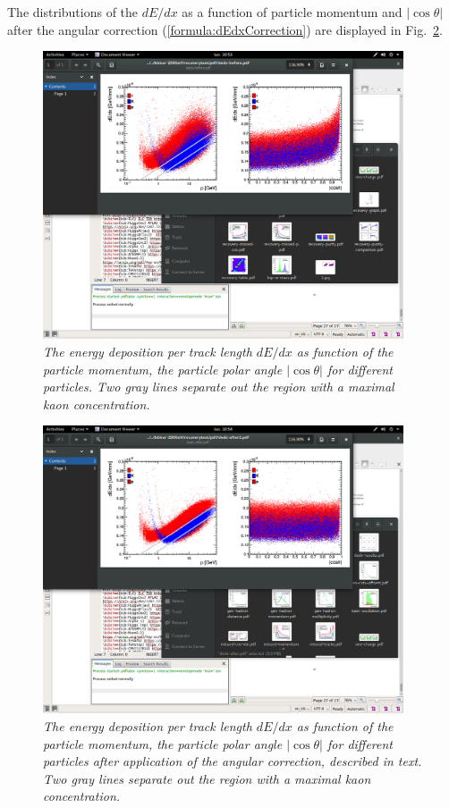 The distributions of the $dE/dx$ as a function of particle momentum and $|\cos\theta|$ after the angular correction (\ref{formula:dEdxCorrection}) are displayed in Fig.~\ref{fig:dEdxAfter_3}.
\begin{figure}[h]
{\centering
    \includegraphics[clip, trim=8cm 18.5cm 7cm 4cm,width=0.95\textwidth]{ILD/plots/dedx-before.png}
    \caption{\sl The energy deposition per track length $dE/dx$ as function of the particle momentum, the particle polar angle $|\cos\theta|$ for different particles. Two gray lines separate out the region with a maximal kaon concentration. 
    }
    \label{fig:dEdxBefore_3}
  }
\end{figure}

\begin{figure}[h]
{\centering
    \includegraphics[clip, trim=8cm 18.5cm 7cm 4cm, width=0.95\textwidth]{ILD/plots/dedx-after.png}
    \caption{\sl The energy deposition per track length $dE/dx$ as function of the particle momentum, the particle polar angle $|\cos\theta|$ for different particles after application of the angular correction, described in text. Two gray lines separate out the region with a maximal kaon concentration. 
    }
    \label{fig:dEdxAfter_3}
  }
\end{figure}


